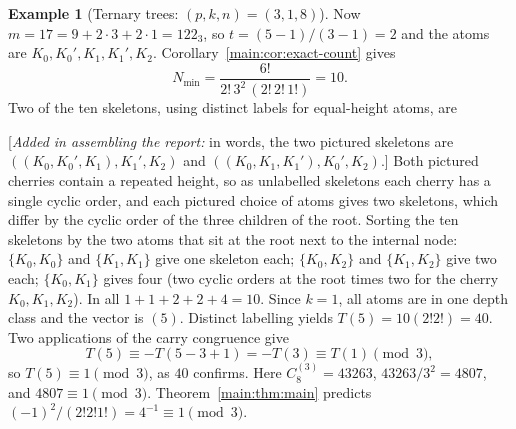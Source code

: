 \documentclass[11pt]{article}
\theoremstyle{definition}
\newtheorem{example}[theorem]{Example}
\theoremstyle{remark}
\numberwithin{equation}{section}
\numberwithin{figure}{section}
\newcommand{\assembler}[1]{[\emph{Added in assembling the report:} #1]}
\begin{document}
\begin{example}[Ternary trees: $(p,k,n)=(3,1,8)$]\label{main:ex:ternary}
Now $m=17=9+2\cdot3+2\cdot1=122_3$, so $t=(5-1)/(3-1)=2$ and the atoms are $K_0,K_0',K_1,K_1',K_2$.  Corollary~\ref{main:cor:exact-count} gives
\[
 N_{\min}=\frac{6!}{2!\,3^2\,(2!\,2!\,1!)}=10.
\]
Two of the ten skeletons, using distinct labels for equal-height atoms, are
\begin{center}
\qquad
{}
\end{center}
\assembler{in words, the two pictured skeletons are $((K_0,K_0',K_1),K_1',K_2)$ and
$((K_0,K_1,K_1'),K_0',K_2)$.}
Both pictured cherries contain a repeated height, so as unlabelled skeletons each cherry has a single cyclic order, and each pictured choice of atoms gives two skeletons, which differ by the cyclic order of the three children of the root.  Sorting the ten skeletons by the two atoms that sit at the root next to the internal node: $\{K_0,K_0\}$ and $\{K_1,K_1\}$ give one skeleton each; $\{K_0,K_2\}$ and $\{K_1,K_2\}$ give two each; $\{K_0,K_1\}$ gives four (two cyclic orders at the root times two for the cherry $K_0,K_1,K_2$).  In all $1+1+2+2+4=10$.  Since $k=1$, all atoms are in one depth class and the vector is $(5)$.  Distinct labelling yields $T(5)=10(2!2!)=40$.  Two applications of the carry congruence give
\[
 T(5)\equiv-T(5-3+1)=-T(3)\equiv T(1)\pmod3,
\]
so $T(5)\equiv1\pmod3$, as $40$ confirms.  Here $C_8^{(3)}=43263$, $43263/3^2=4807$, and $4807\equiv1\pmod3$.  Theorem~\ref{main:thm:main} predicts $(-1)^2/(2!2!1!)=4^{-1}\equiv1\pmod3$.
\end{example}
\end{document}
